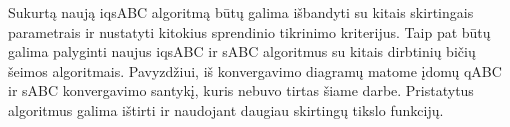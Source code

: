 \documentclass{VUMIFKompMagistrinis}
\begin{document}


Sukurtą naują iqsABC algoritmą būtų galima išbandyti su kitais skirtingais parametrais ir nustatyti kitokius sprendinio tikrinimo kriterijus. Taip pat būtų galima palyginti naujus iqsABC ir sABC algoritmus su kitais dirbtinių bičių šeimos algoritmais. Pavyzdžiui, iš konvergavimo diagramų matome įdomų qABC ir sABC konvergavimo santykį, kuris nebuvo tirtas šiame darbe. Pristatytus algoritmus galima ištirti ir naudojant daugiau skirtingų tikslo funkcijų.





























\printbibliography[heading=bibintoc]  

\end{document}

